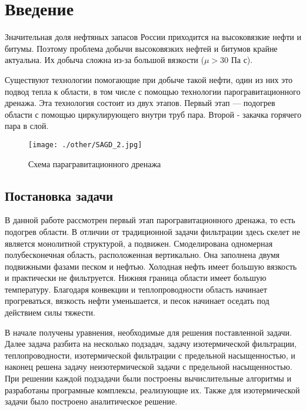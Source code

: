 \documentclass[12pt,a4paper]{article}
\begin{document}
\newpage
\tableofcontents
\newpage
\section{Введение}


Значительная доля нефтяных запасов России приходится на высоковязкие нефти и битумы. Поэтому проблема добычи высоковязких нефтей и битумов крайне актуальна. Их добыча сложна из-за большой вязкости ($\mu > 30$ Па с). 

Существуют технологии помогающие при добыче такой нефти, один из них это подвод тепла к области, в том числе с помощью технологии парогравитационного дренажа. Эта технология состоит из двух этапов. Первый этап — подогрев области с помощью циркулирующего внутри труб пара. Второй - закачка горячего пара в слой.

\begin{figure}[h!]
\begin{center}
\texttt{[image: ./other/SAGD\_2.jpg]}
\caption{Схема парагравитационного дренажа}
\end{center}
\end{figure}

\subsection {Постановка задачи}

В данной работе рассмотрен первый этап парогравитационного дренажа, то есть подогрев области. В отличии от традиционной задачи фильтрации здесь скелет не является монолитной структурой, а подвижен. Смоделирована одномерная полубесконечная область, расположенная вертикально. Она заполнена двумя подвижными фазами песком и нефтью. Холодная нефть имеет большую вязкость и практически не фильтруется. Нижняя граница области имеет большую температуру. Благодаря конвекции и теплопроводности область начинает прогреваться, вязкость нефти уменьшается, и песок начинает оседать под действием силы тяжести.

В начале получены уравнения, необходимые для решения поставленной задачи. Далее задача разбита на несколько подзадач, задачу изотермической фильтрации, теплопроводности, изотермической фильтрации с предельной насыщенностью, и наконец решена задачу неизотермической задачи с предельной насыщенностью. При решении каждой подзадачи были построены вычислительные алгоритмы и разработаны програмные комплексы, реализующие их. Также для изотермической задачи было построено аналитическое решение.
\end{document}
